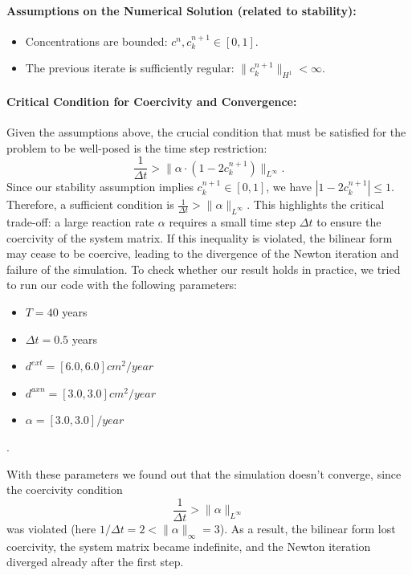 \documentclass[12pt, a4paper, twoside, openright]{report}
\begin{document}
\paragraph{Assumptions on the Numerical Solution (related to stability):}
\begin{itemize}
  \item Concentrations are bounded: $c^n, c_k^{n+1} \in [0,1]$.
  \item The previous iterate is sufficiently regular: $\|c_k^{n+1}\|_{H^1} < \infty$.
\end{itemize}

\paragraph{Critical Condition for Coercivity and Convergence:}
Given the assumptions above, the crucial condition that must be satisfied for the problem to be well-posed is the time step restriction:
\[
  \frac{1}{\Delta t} > \|\alpha \cdot \left(1 - 2c_k^{n+1}\right)\|_{L^\infty}.
\]
Since our stability assumption implies $c_k^{n+1} \in [0,1]$, we have $|1-2c_k^{n+1}| \le 1$. Therefore, a sufficient condition is $\frac{1}{\Delta t} > \|\alpha\|_{L^\infty}$. This highlights the critical trade-off: a large reaction rate $\alpha$ requires a small time step $\Delta t$ to ensure the coercivity of the system matrix. If this inequality is violated, the bilinear form may cease to be coercive, leading to the divergence of the Newton iteration and failure of the simulation.
To check whether our result holds in practice, we tried to run our code with the following parameters:
\begin{itemize}
  \item \( T = 40 \) years
  \item \( \Delta t = 0.5 \) years
  \item \( d^{ext} = [6.0, 6.0] cm^2/year\)
  \item \( d^{axn} = [3.0, 3.0] cm^2/year\)
  \item \( \alpha = [3.0, 3.0] /year\)
\end{itemize}.

With these parameters we found out that the simulation doesn't converge, since the coercivity condition
\[
  \frac{1}{\Delta t} > \|\alpha\|_{L^\infty}
\]
was violated (here $1/\Delta t = 2 < \|\alpha\|_\infty = 3$). As a result, the bilinear form lost coercivity, the system matrix became indefinite, and the Newton iteration diverged already after the first step.
\end{document}
